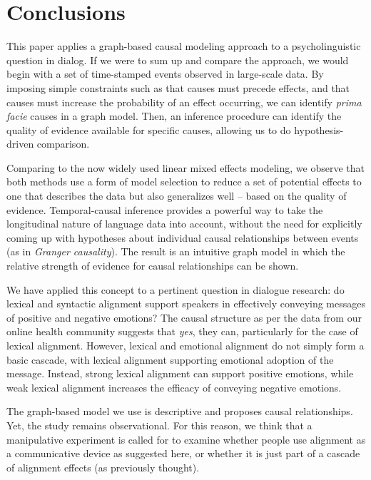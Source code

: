 \documentclass[man,biblatex,floatsintext]{apa6}
\begin{document}
\section{Conclusions}

This paper applies a graph-based causal modeling approach to a psycholinguistic question in dialog.  If we were to sum up and compare the approach, we would begin with a set of time-stamped events observed in large-scale data.  By imposing simple constraints such as that causes must precede effects, and that causes must increase the probability of an effect occurring, we can identify \emph{prima facie} causes in a graph model.  Then, an inference procedure can identify the quality of evidence available for specific causes, allowing us to do hypothesis-driven comparison.

Comparing to the now widely used linear mixed effects modeling, we observe that both methods use a form of model selection to reduce a set of potential effects to one that describes the data but also generalizes well -- based on the quality of evidence.  Temporal-causal inference provides a powerful way to take the longitudinal nature of language data into account, without the need for explicitly coming up with hypotheses about individual causal relationships between events (as in \emph{Granger causality}).  The result is an intuitive graph model in which the relative strength of evidence for causal relationships can be shown.

We have applied this concept to a pertinent question in dialogue research: do lexical and syntactic alignment support speakers in effectively conveying messages of positive and negative emotions?  The causal structure as per the data from our online health community suggests that \emph{yes}, they can, particularly for the case of lexical alignment.  However, lexical and emotional alignment do not simply form a basic cascade, with lexical alignment supporting emotional adoption of the message.  Instead, strong lexical alignment can support positive emotions, while weak lexical alignment increases the efficacy of conveying negative emotions.

The graph-based model we use is descriptive and proposes causal relationships.  Yet, the study remains observational.  For this reason, we think that a manipulative experiment is called for to examine whether people use alignment as a communicative device as suggested here, or whether it is just part of a cascade of alignment effects (as previously thought).
\end{document}
